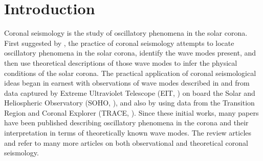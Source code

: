 \documentclass[onecolumn]{emulateapj}
\newcommand{\BF}{ }
\begin{document}



\section{Introduction}\label{sec:int}
Coronal seismology is the study of oscillatory phenomena in the solar
corona.  First suggested by \cite{1970PASJ...22..341U}, the practice
of coronal seismology attempts to locate oscillatory phenomena in the
solar corona, identify the wave modes present, and then use
theoretical descriptions of those wave modes to infer the physical
conditions of the solar corona.  The practical application of coronal
seismological ideas began in earnest with observations of wave modes
{\BF described in \cite{1998ApJ...501L.217D} and
  \cite{1999SoPh..186..207B} from data captured by Extreme Ultraviolet
  Telescope (EIT, \citealp{1995SoPh..162..291D}) on board the Solar and Heliospheric
  Observatory (SOHO, \citealp{1995SoPh..162....1D}), and also by
  \citep{1999ApJ...520..880A} using data from the Transition Region
  and Coronal Explorer (TRACE, \citealp{1999SoPh..187..229H}).  Since these initial works,
  many papers have been published describing oscillatory phenomena in
  the corona and their interpretation in terms of theoretically known
  wave modes.  The review articles \cite{lrsp-2005-3} and
  \cite{2012RSPTA.370.3193D} refer to many more articles on both
  observational and theoretical coronal seismology}.
\end{document}

